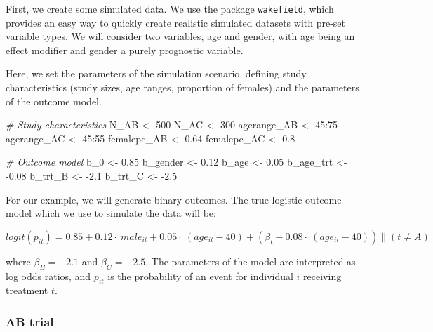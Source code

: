 \documentclass[
]{article}
\newenvironment{Shaded}{\begin{snugshade}}{\end{snugshade}}
\newcommand{\CommentTok}[1]{\textcolor[rgb]{0.56,0.35,0.01}{\textit{#1}}}
\newcommand{\DecValTok}[1]{\textcolor[rgb]{0.00,0.00,0.81}{#1}}
\newcommand{\FloatTok}[1]{\textcolor[rgb]{0.00,0.00,0.81}{#1}}
\newcommand{\NormalTok}[1]{#1}
\newcommand{\OtherTok}[1]{\textcolor[rgb]{0.56,0.35,0.01}{#1}}
\newcommand{\SpecialCharTok}[1]{\textcolor[rgb]{0.00,0.00,0.00}{#1}}
\begin{document}
First, we create some simulated data. We use the package
\texttt{wakefield}, which provides an easy way to quickly create
realistic simulated datasets with pre-set variable types. We will
consider two variables, age and gender, with age being an effect
modifier and gender a purely prognostic variable.

Here, we set the parameters of the simulation scenario, defining study
characteristics (study sizes, age ranges, proportion of females) and the
parameters of the outcome model.

\begin{Shaded}
\begin{Highlighting}[]
\CommentTok{\# Study characteristics}
\NormalTok{N\_AB }\OtherTok{\textless{}{-}} \DecValTok{500}
\NormalTok{N\_AC }\OtherTok{\textless{}{-}} \DecValTok{300}
\NormalTok{agerange\_AB }\OtherTok{\textless{}{-}} \DecValTok{45}\SpecialCharTok{:}\DecValTok{75}
\NormalTok{agerange\_AC }\OtherTok{\textless{}{-}} \DecValTok{45}\SpecialCharTok{:}\DecValTok{55}
\NormalTok{femalepc\_AB }\OtherTok{\textless{}{-}} \FloatTok{0.64}
\NormalTok{femalepc\_AC }\OtherTok{\textless{}{-}} \FloatTok{0.8}

\CommentTok{\# Outcome model}
\NormalTok{b\_0 }\OtherTok{\textless{}{-}} \FloatTok{0.85}
\NormalTok{b\_gender }\OtherTok{\textless{}{-}} \FloatTok{0.12}
\NormalTok{b\_age }\OtherTok{\textless{}{-}} \FloatTok{0.05}
\NormalTok{b\_age\_trt }\OtherTok{\textless{}{-}} \SpecialCharTok{{-}}\FloatTok{0.08}
\NormalTok{b\_trt\_B }\OtherTok{\textless{}{-}} \SpecialCharTok{{-}}\FloatTok{2.1}
\NormalTok{b\_trt\_C }\OtherTok{\textless{}{-}} \SpecialCharTok{{-}}\FloatTok{2.5}
\end{Highlighting}
\end{Shaded}

For our example, we will generate binary outcomes. The true logistic
outcome model which we use to simulate the data will be:

\[logit(p_{it})=0.85+0.12\cdot\ male_{it}+0.05\cdot\ (age_{it}-40)+(\beta_{t}-0.08\cdot\ (age_{it}-40))\parallel(t\neq A)\]

where \(\beta_{B}=-2.1\) and \(\beta_{C}=-2.5\). The parameters of the
model are interpreted as log odds ratios, and \(p_{it}\) is the
probability of an event for individual \(i\) receiving treatment \(t\).

\hypertarget{ab-trial}{%
\subsubsection{AB trial}\label{ab-trial}}
\end{document}
